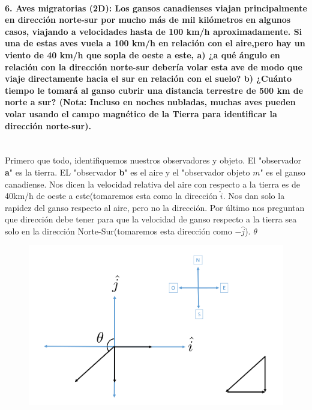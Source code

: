 \documentclass[a4paper,11pt]{article}
\theoremstyle{mytheor}
\begin{document}
 \paragraph{6. Aves migratorias (2D): Los gansos canadienses viajan principalmente en dirección norte-sur por mucho más de mil kilómetros en
 algunos casos, viajando a velocidades hasta de 100 km/h aproximadamente. Si una de estas aves vuela a 100 km/h en relación con el aire,pero hay un viento de 40 km/h que sopla de oeste a este, a) ¿a qué
 ángulo en relación con la dirección norte-sur debería volar esta ave
 de modo que viaje directamente hacia el sur en relación con el suelo?
 b) ¿Cuánto tiempo le tomará al ganso cubrir una distancia terrestre de
 500 km de norte a sur? (Nota: Incluso en noches nubladas, muchas
 aves pueden volar usando el campo magnético de la Tierra para identificar la dirección norte-sur).\\
 \\}


Primero que todo, identifiquemos nuestros observadores y objeto. El "observador \textbf{a}" es la tierra. EL "observador \textbf{b}" es el aire y el "observador objeto $m$" es el ganso canadiense. Nos dicen la velocidad relativa del aire con respecto a la tierra es de 40km/h de oeste a este(tomaremos esta como la dirección $\hat{i}$. Nos dan solo la rapidez del ganso respecto al aire, pero no la dirección. Por último nos preguntan que dirección debe tener para que la velocidad de ganso respecto a la tierra sea solo en la dirección Norte-Sur(tomaremos esta dirección como $-\hat{j}$).  $\theta$ 





\begin{figure}[h]
	\includegraphics[width=1.0\linewidth]{./im/4}
	\label{fcN4}
\end{figure}
\end{document}
